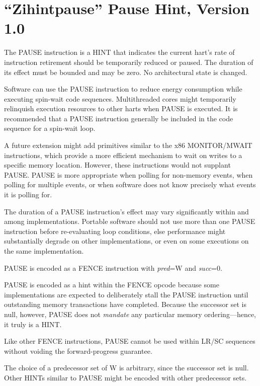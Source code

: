 \chapter{``Zihintpause'' Pause Hint, Version 1.0}
\label{chap:zihintpause}

The PAUSE instruction is a HINT that indicates the current hart's rate of
instruction retirement should be temporarily reduced or paused.  The duration of its
effect must be bounded and may be zero.  No architectural state is changed.

\begin{commentary}
Software can use the PAUSE instruction to reduce energy consumption while
executing spin-wait code sequences.  Multithreaded cores might temporarily
relinquish execution resources to other harts when PAUSE is executed.
It is recommended that a PAUSE instruction generally be included in the code
sequence for a spin-wait loop.

A future extension might add primitives similar to the x86 MONITOR/MWAIT
instructions, which provide a more efficient mechanism to wait on writes to
a specific memory location.
However, these instructions would not supplant PAUSE.
PAUSE is more appropriate when polling for non-memory events, when polling for
multiple events, or when software does not know precisely what events it is
polling for.

The duration of a PAUSE instruction's effect may vary significantly within and
among implementations.
Portable software should not use more than one PAUSE instruction before
re-evaluating loop conditions, else performance might substantially degrade on
other implementations, or even on some executions on the same implementation.
\end{commentary}

PAUSE is encoded as a FENCE instruction with {\em pred}=W and {\em succ}=0.

\begin{commentary}
PAUSE is encoded as a hint within the FENCE opcode because some
implementations are expected to deliberately stall the PAUSE instruction until outstanding
memory transactions have completed.
Because the successor set is null, however, PAUSE does not {\em mandate} any
particular memory ordering---hence, it truly is a HINT.

Like other FENCE instructions, PAUSE cannot be used within LR/SC sequences
without voiding the forward-progress guarantee.

The choice of a predecessor set of W is arbitrary, since the successor set is
null.
Other HINTs similar to PAUSE might be encoded with other predecessor sets.
\end{commentary}
